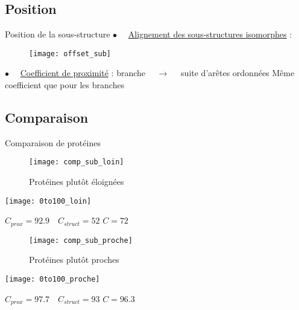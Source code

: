 \subsection{Position}
\begin{frame}{Position de la sous-structure}
    $\bullet \quad$ \underline{Alignement des sous-structures isomorphes} :
    \begin{figure}[!htb]
        \centering
        \texttt{[image: offset\_sub]}
    \end{figure}
    $\bullet \quad$ \underline{Coefficient de proximité} : \newline \newline
    branche $\quad \rightarrow \quad$ suite d'arêtes ordonnées \newline
    Même coefficient que pour les branches
\end{frame}

\subsection{Comparaison}
\begin{frame}{Comparaison de protéines}
    \begin{multicols}{2}
        \begin{figure}[!htb]
            \centering
            \texttt{[image: comp\_sub\_loin]}
            \caption{\label{fig: subcomp_loin} Protéines plutôt éloignées}
        \end{figure}
        \texttt{[image: 0to100\_loin]}
        \begin{center}
            $C_{prox}=92.9 \quad C_{struct}=52$\newline \newline
            $\boxed{C=72}$
        \end{center}
    \end{multicols}
    \begin{multicols}{2}
        \begin{figure}[!htb]
            \centering
            \texttt{[image: comp\_sub\_proche]}
            \caption{\label{fig: subcom_proche} Protéines plutôt proches}
        \end{figure}
        \texttt{[image: 0to100\_proche]}
        \begin{center}
            $C_{prox}=97.7 \quad C_{struct}=93$\newline \newline
            $\boxed{C=96.3}$
        \end{center}
    \end{multicols}
\end{frame}